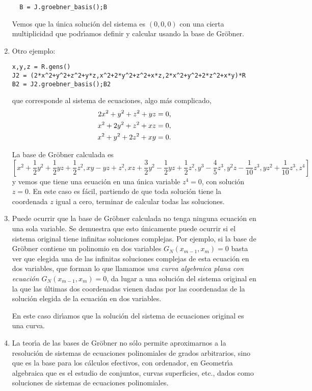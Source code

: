 \begin{enumerate}
 \begin{lstlisting}
  B = J.groebner_basis();B
 \end{lstlisting}

 \begin{Output}
[x^2, y^2, z^2]
\end{Output}

Vemos que la \'unica soluci\'on del sistema es $(0,0,0)$ con una cierta 
multiplicidad que podr\'{\i}amos definir y calcular usando la base de Gr\"obner.

\item Otro ejemplo:

\begin{lstlisting}
x,y,z = R.gens()
J2 = (2*x^2+y^2+z^2+y*z,x^2+2*y^2+z^2+x*z,2*x^2+y^2+2*z^2+x*y)*R
B2 = J2.groebner_basis();B2
\end{lstlisting}
\noindent que corresponde al sistema de ecuaciones, algo m\'as complicado, 
\begin{align*}\notag
  2x^2+y^2+z^2+yz&=0,\\
  x^2+2y^2+z^2+xz&=0,\\
  x^2+y^2+2z^2+xy&=0.
 \end{align*}
 
 La base de Gr\"obner calculada es 
 \[\left[x^{2} + \frac{1}{2} y^{2} + \frac{1}{2} y z + \frac{1}{2} z^{2}, x
y -  y z + z^{2}, x z + \frac{3}{2} y^{2} - \frac{1}{2} y z +
\frac{1}{2} z^{2}, y^{3} - \frac{4}{5} z^{3}, y^{2} z - \frac{1}{10}
z^{3}, y z^{2} + \frac{1}{10} z^{3}, z^{4}\right]\]
\noindent y vemos que tiene una ecuaci\'on en una \'unica variable $z^4=0$, con 
soluci\'on $z=0$. En este caso es f\'acil, partiendo de que toda soluci\'on 
tiene la coordenada $z$ igual a cero, terminar de calcular todas las 
soluciones. 
 
\item Puede ocurrir que la base de Gr\"obner calculada no tenga ninguna 
ecuaci\'on en una sola variable. Se demuestra que esto \'unicamente puede 
ocurrir si el sistema original tiene infinitas soluciones complejas. Por 
ejemplo, si la base de Gr\"obner contiene un polinomio en dos variables 
$G_N(x_{m-1},x_m)=0$ basta ver que elegida  una de las infinitas soluciones 
complejas de esta ecuaci\'on en dos variables, que forman lo que llamamos 
{\itshape una curva algebraica plana con ecuaci\'on  $G_N(x_{m-1},x_m)=0$}, da 
lugar a una soluci\'on del sistema original en la que las \'ultimas dos 
coordenadas vienen dadas por las coordenadas de la soluci\'on elegida de la 
ecuaci\'on en dos variables. 

En este caso dir\'{\i}amos que la soluci\'on del sistema de ecuaciones original 
es una curva. 

\item La teor\'{\i}a de las bases de Gr\"obner no s\'olo permite aproximarnos a 
la resoluci\'on de sistemas de ecuaciones polinomiales de grados arbitrarios, 
sino que es la base para los c\'alculos efectivos, con ordenador, en 
Geometr\'{\i}a algebraica que es el estudio de conjuntos, curvas superficies, 
etc., dados como soluciones de sistemas de ecuaciones polinomiales. 
 
 
\end{enumerate}

